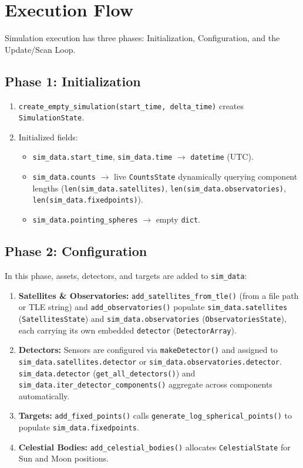 \documentclass[11pt,a4paper]{article}
\begin{document}
\section{Execution Flow}
Simulation execution has three phases: Initialization, Configuration, and the Update/Scan Loop.

\subsection{Phase 1: Initialization}
\begin{enumerate}
    \item \texttt{create\_empty\_simulation(start\_time, delta\_time)} creates
    \texttt{SimulationState}.
    \item Initialized fields:
    \begin{itemize}
        \item \texttt{sim\_data.start\_time}, \texttt{sim\_data.time} $\rightarrow$
        \texttt{datetime} (UTC).
        \item \texttt{sim\_data.counts} $\rightarrow$ live \texttt{CountsState} dynamically
        querying component lengths (\texttt{len(sim\_data.satellites)},
        \texttt{len(sim\_data.observatories)}, \texttt{len(sim\_data.fixedpoints)}).
        \item \texttt{sim\_data.pointing\_spheres} $\rightarrow$ empty \texttt{dict}.
    \end{itemize}
\end{enumerate}

\subsection{Phase 2: Configuration}
In this phase, assets, detectors, and targets are added to \texttt{sim\_data}:
\begin{enumerate}
    \item \textbf{Satellites \& Observatories:} \texttt{add\_satellites\_from\_tle()} (from a
    file path or TLE string) and \texttt{add\_observatories()} populate
    \texttt{sim\_data.satellites} (\texttt{SatellitesState}) and
    \texttt{sim\_data.observatories} (\texttt{ObservatoriesState}), each carrying its own
    embedded \texttt{detector} (\texttt{DetectorArray}).
    \item \textbf{Detectors:} Sensors are configured via \texttt{makeDetector()} and assigned to
    \texttt{sim\_data.satellites.detector} or \texttt{sim\_data.observatories.detector}.
    \texttt{sim\_data.detector} (\texttt{get\_all\_detectors()}) and
    \texttt{sim\_data.iter\_detector\_components()} aggregate across components automatically.
    \item \textbf{Targets:} \texttt{add\_fixed\_points()} calls
    \texttt{generate\_log\_spherical\_points()} to populate \texttt{sim\_data.fixedpoints}.
    \item \textbf{Celestial Bodies:} \texttt{add\_celestial\_bodies()} allocates
    \texttt{CelestialState} for Sun and Moon positions.
\end{enumerate}
\end{document}
